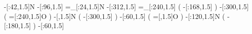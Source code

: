       -[:42,1.5]N%
      -[:96,1.5]%
     =_[:24,1.5]N%
     -[:312,1.5]%
    =_[:240,1.5]%
                   (
         -[:168,1.5]\phantom{N}%
                   )
     -[:300,1.5]%
                   (
         =[:240,1.5]O%
                   )
         -[,1.5]N%
                   (
         -[:300,1.5]%
                   )
      -[:60,1.5]%
                   (
             =[,1.5]O%
                   )
     -[:120,1.5]N%
                   (
         -[:180,1.5]%
                   )
      -[:60,1.5]%